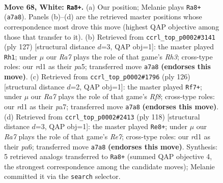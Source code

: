 \documentclass[11pt]{article}
\begin{document}
\clearpage

\begin{figure}[p]\centering
\begin{subfigure}{0.46\textwidth}\centering
\resizebox{\linewidth}{!}{%
\newchessgame
\chessboard[
  setfen={7k/R7/8/8/5K2/1r6/7P/3r4 w - - 3 68},
  showmover=false,
  pgfstyle=straightmove, color=movearrow, markmove={a7-a8}
]}
\caption{}
\end{subfigure}\hfill
\begin{subfigure}{0.46\textwidth}\centering
\resizebox{\linewidth}{!}{%
\newchessgame
\chessboard[
  setfen={8/1K6/7r/P3k1p1/2R5/8/8/8 b - - 1 64},
  showmover=false,
  pgfstyle=straightmove, color=movearrow, markmove={h6-h1}
]}
\caption{}
\end{subfigure}
\\[4pt]
\begin{subfigure}{0.46\textwidth}\centering
\resizebox{\linewidth}{!}{%
\newchessgame
\chessboard[
  setfen={5R2/p6k/8/8/7K/2r5/6P1/8 w - - 1 64},
  showmover=false,
  pgfstyle=straightmove, color=movearrow, markmove={f8-f7}
]}
\caption{}
\end{subfigure}\hfill
\begin{subfigure}{0.46\textwidth}\centering
\resizebox{\linewidth}{!}{%
\newchessgame
\chessboard[
  setfen={1k6/4R3/p7/8/7r/1P6/8/1K6 w - - 18 60},
  showmover=false,
  pgfstyle=straightmove, color=movearrow, markmove={e7-e8}
]}
\caption{}
\end{subfigure}
\caption{\textbf{Move 68, White: \texttt{Ra8+}.} (a) Our position; Melanie plays \texttt{Ra8+} (\texttt{a7a8}). Panels (b)--(d) are the retrieved master positions whose correspondence most drove this move (highest QAP objective among those that transfer to it). (b) Retrieved from \texttt{ccrl\_top\_p0002\#3141} (ply 127) [structural distance $d$=3, QAP obj=1]: the master played \texttt{Rh1}; under $\mu$ our \emph{Ra7} plays the role of that game's \emph{Rh3}; cross-type roles: our \emph{r}d1 as their \emph{p}a5; transferred move \texttt{a7a8} \textbf{(endorses this move)}. (c) Retrieved from \texttt{ccrl\_top\_p0002\#1796} (ply 126) [structural distance $d$=2, QAP obj=1]: the master played \texttt{Rf7+}; under $\mu$ our \emph{Ra7} plays the role of that game's \emph{Rf8}; cross-type roles: our \emph{r}d1 as their \emph{p}a7; transferred move \texttt{a7a8} \textbf{(endorses this move)}. (d) Retrieved from \texttt{ccrl\_top\_p0002\#2413} (ply 118) [structural distance $d$=3, QAP obj=1]: the master played \texttt{Re8+}; under $\mu$ our \emph{Ra7} plays the role of that game's \emph{Re7}; cross-type roles: our \emph{r}d1 as their \emph{p}a6; transferred move \texttt{a7a8} \textbf{(endorses this move)}. Synthesis: 5 retrieved analogs transferred to \texttt{Ra8+} (summed QAP objective 4, the strongest correspondence among the candidate moves); Melanie committed it via the \texttt{search} selector.}
\label{fig:thought-m134}
\end{figure}
\end{document}
